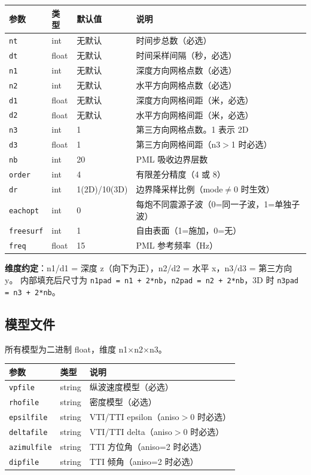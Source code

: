 \documentclass[11pt,a4paper]{ctexart}
\begin{document}
\begin{longtable}{lllp{5cm}}
\toprule
\textbf{参数} & \textbf{类型} & \textbf{默认值} & \textbf{说明} \\
\midrule
\endhead
\texttt{nt}      & int   & 无默认 & 时间步总数（必选）\\
\texttt{dt}      & float & 无默认 & 时间采样间隔（秒，必选）\\
\texttt{n1}      & int   & 无默认 & 深度方向网格点数（必选）\\
\texttt{n2}      & int   & 无默认 & 水平方向网格点数（必选）\\
\texttt{d1}      & float & 无默认 & 深度方向网格间距（米，必选）\\
\texttt{d2}      & float & 无默认 & 水平方向网格间距（米，必选）\\
\texttt{n3}      & int   & 1      & 第三方向网格点数。1 表示 2D \\
\texttt{d3}      & float & 1      & 第三方向网格间距（n3$>$1 时必选）\\
\texttt{nb}      & int   & 20     & PML 吸收边界层数 \\
\texttt{order}   & int   & 4      & 有限差分精度（4 或 8）\\
\texttt{dr}      & int   & 1(2D)/10(3D) & 边界降采样比例（mode$\neq$0 时生效）\\
\texttt{eachopt} & int   & 0      & 每炮不同震源子波（0=同一子波，1=单独子波）\\
\texttt{freesurf} & int  & 1      & 自由表面（1=施加，0=无）\\
\texttt{freq}    & float & 15     & PML 参考频率（Hz）\\
\bottomrule
\end{longtable}

\textbf{维度约定}：n1/d1 = 深度 z（向下为正），n2/d2 = 水平 x，n3/d3 = 第三方向 y。
内部填充后尺寸为 \texttt{n1pad = n1 + 2*nb}，\texttt{n2pad = n2 + 2*nb}，3D 时 \texttt{n3pad = n3 + 2*nb}。

\subsection{模型文件}

所有模型为二进制 float，维度 n1$\times$n2$\times$n3。

\begin{longtable}{llp{8cm}}
\toprule
\textbf{参数} & \textbf{类型} & \textbf{说明} \\
\midrule
\endhead
\texttt{vpfile}   & string & 纵波速度模型（必选）\\
\texttt{rhofile}  & string & 密度模型（必选）\\
\texttt{epsilfile} & string & VTI/TTI epsilon（aniso$>$0 时必选）\\
\texttt{deltafile} & string & VTI/TTI delta（aniso$>$0 时必选）\\
\texttt{azimulfile} & string & TTI 方位角（aniso=2 时必选）\\
\texttt{dipfile}   & string & TTI 倾角（aniso=2 时必选）\\
\bottomrule
\end{longtable}
\end{document}
